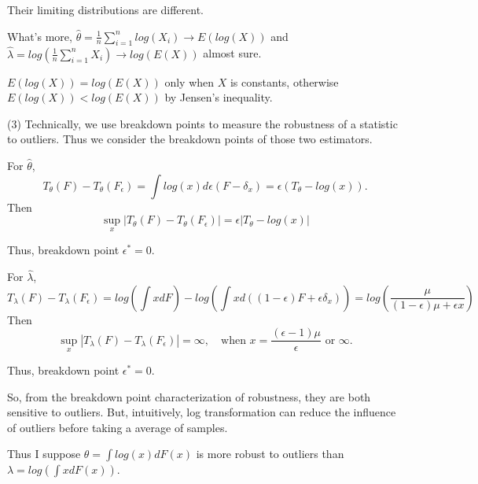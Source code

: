 \begin{solution}
    Their limiting distributions are different.

    What's more, $\hat{\theta}=\frac{1}{n} \sum_{i=1}^n log(X_i) \to E(log(X))$ and $\hat{\lambda} = log\left( \frac{1}{n} \sum_{i=1}^n X_i\right) \to log(E(X))$ almost sure.

    $E(log(X)) = log(E(X))$ only when $X$ is constants, otherwise $E(log(X)) < log(E(X))$ by Jensen's inequality.

    (3) Technically, we use breakdown points to measure the robustness of a statistic to outliers. Thus we consider the breakdown points of those two estimators.
    
    For $\hat{\theta}$, 
    \begin{equation*}
        T_\theta(F) - T_\theta(F_\epsilon) = \int log(x) d \epsilon (F -\delta_x)
        = \epsilon (T_\theta - log(x)).
    \end{equation*}
    Then
    \begin{equation*}
        \sup_x | T_\theta(F) - T_\theta(F_\epsilon) | = \epsilon |T_\theta - log(x)|
    \end{equation*}

    Thus, breakdown point $\epsilon^* = 0$.

    For $\hat{\lambda}$, 
    \begin{equation*}
        T_\lambda(F) - T_\lambda(F_\epsilon) = log \left( \int x d F \right) - log \left( \int x d( (1-\epsilon)F + \epsilon \delta_x)\right)
        = log\left(\frac{\mu}{(1-\epsilon)\mu + \epsilon x}\right)
    \end{equation*}
    Then
    \begin{equation*}
        \sup_x | T_\lambda(F) - T_\lambda(F_\epsilon) | 
        =  \infty,
        \quad \text{when } x = \frac{(\epsilon - 1)\mu}{\epsilon} \text{ or } \infty.
    \end{equation*}

    Thus, breakdown point $\epsilon^* = 0$.

    So, from the breakdown point characterization of robustness, they are both sensitive to outliers. 
    But, intuitively, log transformation can reduce the influence of outliers before taking a average of samples. 
    
    Thus I suppose $\theta= \int log(x) d F(x)$ is more robust to outliers than $\lambda = log \left( \int  x d F(x) \right)$.

\end{solution}
